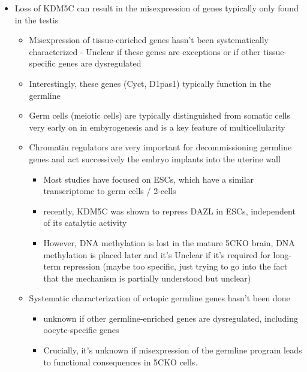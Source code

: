 \documentclass[
]{article}
\providecommand{\tightlist}{%
  \setlength{\itemsep}{0pt}\setlength{\parskip}{0pt}}
\begin{document}
\begin{itemize}
\tightlist
\item
  Loss of KDM5C can result in the misexpression of genes typically only
  found in the testis

  \begin{itemize}
  \tightlist
  \item
    Misexpression of tissue-enriched genes hasn't been systematically
    characterized - Unclear if these genes are exceptions or if other
    tissue-specific genes are dysregulated
  \item
    Interestingly, these genes (Cyct, D1pas1) typically function in the
    germline
  \item
    Germ cells (meiotic cells) are typically distinguished from somatic
    cells very early on in embyrogenesis and is a key feature of
    multicellularity
  \item
    Chromatin regulators are very important for decommissioning germline
    genes and act successively the embryo implants into the uterine wall

    \begin{itemize}
    \tightlist
    \item
      Most studies have focused on ESCs, which have a similar
      transcriptome to germ cells / 2-cells
    \item
      recently, KDM5C was shown to repress DAZL in ESCs, independent of
      its catalytic activity
    \item
      However, DNA methylation is lost in the mature 5CKO brain, DNA
      methylation is placed later and it's Unclear if it's required for
      long-term repression (maybe too specific, just trying to go into
      the fact that the mechanism is partially understood but unclear)
    \end{itemize}
  \item
    Systematic characterization of ectopic germline genes hasn't been
    done

    \begin{itemize}
    \tightlist
    \item
      unknown if other germline-enriched genes are dysregulated,
      including oocyte-specific genes
    \item
      Crucially, it's unknown if misexpression of the germline program
      leads to functional consequences in 5CKO cells.
    \end{itemize}
  \end{itemize}
\end{itemize}
\end{document}
